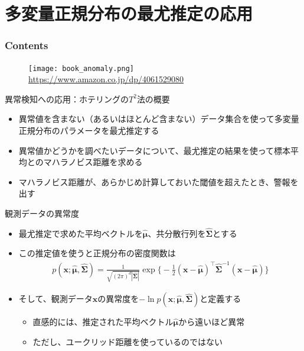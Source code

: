 \documentclass[aspectratio=169,unicode,dvipdfmx,14pt]{beamer}
\begin{document}
\section{多変量正規分布の最尤推定の応用}

\begin{frame}\frametitle{Contents}
\Large \tableofcontents[currentsection]
\end{frame}

\begin{frame}
\begin{figure}[htbp]
\begin{center}
\texttt{[image: book\_anomaly.png]}
{\footnotesize \\ \href{https://www.amazon.co.jp/dp/4061529080}{https://www.amazon.co.jp/dp/4061529080}}
\end{center}
\end{figure}
\end{frame}

\begin{frame}{異常検知への応用：ホテリングの$T^2$法の概要}
\begin{itemize}
\item 異常値を含まない（あるいはほとんど含まない）データ集合を使って多変量正規分布のパラメータを最尤推定する
\item 異常値かどうかを調べたいデータについて、最尤推定の結果を使って標本平均とのマハラノビス距離を求める
\item マハラノビス距離が、あらかじめ計算しておいた閾値を超えたとき、警報を出す
\end{itemize}
\end{frame}

\begin{frame}{観測データの異常度}
\begin{itemize}
\item 最尤推定で求めた平均ベクトルを$\hat{\bm{\mu}}$、共分散行列を$\hat{\bm{\Sigma}}$とする
\item この推定値を使うと正規分布の密度関数は
\begin{align}
p(\bm{x};\hat{\bm{\mu}},\hat{\bm{\Sigma}}) = 
\frac{1}{\sqrt{(2\pi)^d|\hat{\bm{\Sigma}}|}} \exp \bigg\{
- \frac{1}{2} (\bm{x} - \hat{\bm{\mu}})^\intercal \hat{\bm{\Sigma}}^{-1}
(\bm{x} - \hat{\bm{\mu}}) \bigg\}
\end{align}
\item そして、観測データ$\bm{x}$の異常度を$-\ln p(\bm{x};\hat{\bm{\mu}},\hat{\bm{\Sigma}})$と定義する
\begin{itemize}
\item 直感的には、推定された平均ベクトル$\hat{\bm{\mu}}$から遠いほど異常
\item ただし、ユークリッド距離を使っているのではない
\end{itemize}
\end{itemize}
\end{frame}
\end{document}
